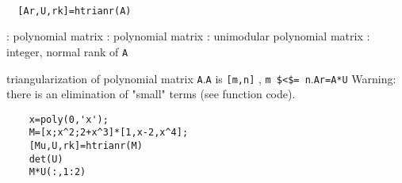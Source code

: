
\begin{mandesc}
   \\ %
\end{mandesc}
\begin{calling_sequence}
\begin{verbatim}
  [Ar,U,rk]=htrianr(A)  
\end{verbatim}
\end{calling_sequence}
\begin{parameters}
  \begin{varlist}
    : polynomial matrix
    : polynomial matrix
    : unimodular polynomial matrix
    : integer, normal rank of \verb!A!
  \end{varlist}
\end{parameters}
\begin{mandescription}
  triangularization of polynomial matrix \verb!A!.\verb!A! is \verb![m,n]! ,   \verb!m $<$= n!.\verb!Ar=A*U!
  Warning: there is an elimination of "small" terms (see function code).
\end{mandescription}
\begin{examples}
  \begin{Verbatim}
    x=poly(0,'x');
    M=[x;x^2;2+x^3]*[1,x-2,x^4];
    [Mu,U,rk]=htrianr(M)
    det(U)
    M*U(:,1:2)
  \end{Verbatim}
\end{examples}
\begin{manseealso}
     
\end{manseealso}
